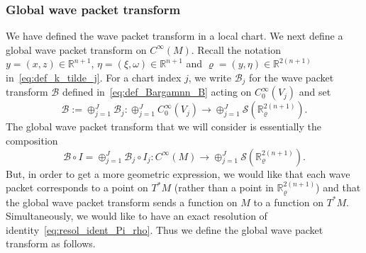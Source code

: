 \documentclass[10pt]{amsart}
\theoremstyle{definition}\newtheorem{defi}[theo]{Definition}\newtheorem{rema}[theo]{Remark}\newtheorem{exam}[theo]{Example}\newtheorem{exem}[theo]{Example}\newtheorem{nota}[theo]{Notation}
\newcommand{\clS}{\mathcal{S}}
\newcommand{\clB}{\mathcal{B}}
\newcommand{\bbR}{\mathbb{R}}
\begin{document}
\subsubsection{\label{subsec:Resolution-of-identity-2}
Global wave packet transform}

We have defined the wave packet transform in a local chart. We next define a global wave packet transform on $C^{\infty}(M)$. Recall the notation $y=(x,z)\in\bbR^{n+1}$, $\eta=(\xi,\omega)\in\bbR^{n+1}$ and $\varrho=(y,\eta)\in\bbR^{2(n+1)}$ in~\eqref{eq:def_k_tilde_j}. For a chart index $j$, we write $\clB_{j}$ for the wave packet transform $\clB$ defined in~\eqref{eq:def_Bargamnn_B} acting on $C_{0}^{\infty}(V_{j})$ and set
\[
\clB:=\oplus_{j=1}^{J}\clB_{j}:\oplus_{j=1}^{J}C_{0}^{\infty}(V_{j})\rightarrow\oplus_{j=1}^{J}\clS\left(\bbR_{\varrho}^{2\left(n+1\right)}\right).
\]
The global wave packet transform that we will consider is essentially the composition
\begin{equation}\label{eq:B-I}
\clB\circ I=\oplus_{j=1}^{J}\clB_{j}\circ I_{j}:C^{\infty}\left(M\right)\rightarrow\oplus_{j=1}^{J}\clS\left(\bbR_{\varrho}^{2\left(n+1\right)}\right).
\end{equation}
But, in order to get a more geometric expression, we would like that each wave packet corresponds to a point on $T^{*}M$ (rather than a point in $\bbR_{\varrho}^{2(n+1)}$) and that the global wave packet transform sends a function on $M$ to a function on $T^{*}M$. Simultaneously, we would like to have an exact resolution of identity~\eqref{eq:resol_ident_Pi_rho}. Thus we define the global wave packet transform as follows.
\end{document}
